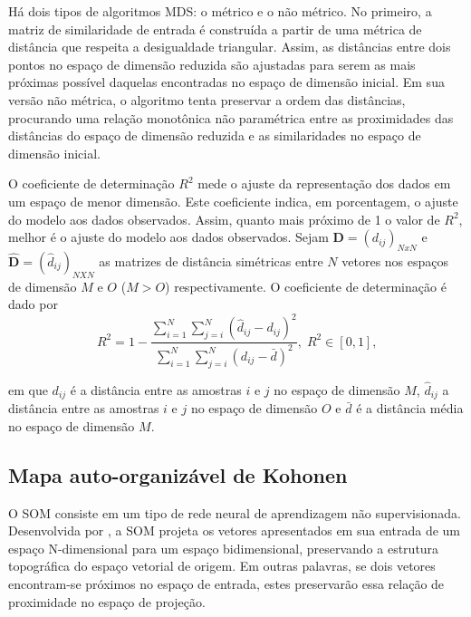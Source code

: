 Há dois tipos de algoritmos \ac{MDS}: o métrico e o não métrico. No primeiro, a matriz de similaridade de entrada é construída a partir de uma métrica de distância que respeita a desigualdade triangular. Assim, as distâncias entre dois pontos no espaço de dimensão reduzida são ajustadas para serem as mais próximas possível daquelas encontradas no espaço de dimensão inicial. Em sua versão não métrica, o algoritmo tenta preservar a ordem das distâncias, procurando uma relação monotônica não paramétrica entre as proximidades das distâncias do espaço de dimensão reduzida e as similaridades no espaço de dimensão inicial.

O coeficiente de determinação $R^2$ mede o ajuste da representação dos dados em um espaço de menor dimensão. Este coeficiente indica, em porcentagem, o ajuste do modelo aos dados observados. Assim, quanto mais próximo de 1 o valor de $R^2$, melhor é o ajuste do modelo aos dados observados.  Sejam $\mathbf{D}=(d_{ij})_{NxN}$ e $\mathbf{\hat{D}}=(\hat{d}_{ij})_{NXN}$ as matrizes de distância simétricas entre $N$ vetores nos espaços de dimensão $M$ e $O$ ($M > O$) respectivamente. O coeficiente de determinação é dado por 
\begin{equation}
R^2= 1-\frac{\sum_{i=1}^N \sum_{j = i}^{N}(\hat{d}_{ij} - d_{ij})^2}{\sum_{i=1}^N\sum_{j=i}^N (d_{ij}-\bar{d})^2}
\text{,}\:\: R^2 \in [0,1]\text{,}
\end{equation}

\noindent em que $d_{ij}$ é a distância entre as amostras $i$ e $j$ no espaço de dimensão $M$,  $\hat{d}_{ij}$ a distância entre as amostras $i$ e $j$ no espaço de dimensão $O$ e $\bar{d}$ é a distância média no espaço de dimensão $M$.

\subsection{\label{subsec:SOM} Mapa auto-organizável de Kohonen}

O \acf{SOM} \cite{Kohonen:2001} consiste em um tipo de rede neural de aprendizagem não supervisionada. Desenvolvida por , a \ac{SOM} projeta os vetores apresentados em sua entrada de um espaço N-dimensional para um espaço bidimensional, preservando a estrutura topográfica do espaço vetorial de origem. Em outras palavras, se dois vetores encontram-se próximos no espaço de entrada, estes preservarão essa relação de proximidade no espaço de projeção. 

\begin{comment}
Em seu processo de treinamento, a rede \emph{SOM} agrupa os vetores de entrada através de um processo de aprendizado competitivo mantendo a estrutura topológica do espaço vetorial de entrada.
\end{comment}

